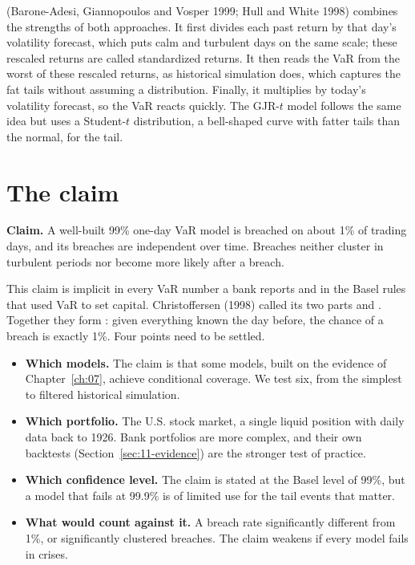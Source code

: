  (Barone-Adesi, Giannopoulos and Vosper 1999; Hull and White 1998) combines the strengths of both approaches. It first divides each past return by that day's volatility forecast, which puts calm and turbulent days on the same scale; these rescaled returns are called standardized returns. It then reads the VaR from the worst of these rescaled returns, as historical simulation does, which captures the fat tails without assuming a distribution. Finally, it multiplies by today's volatility forecast, so the VaR reacts quickly. The GJR-$t$ model follows the same idea but uses a Student-$t$ distribution, a bell-shaped curve with fatter tails than the normal, for the tail.



\section{The claim}
\label{sec:11-claim}

\begin{callout}
\textbf{Claim.} A well-built 99\% one-day VaR model is breached on about 1\% of trading days, and its breaches are independent over time. Breaches neither cluster in turbulent periods nor become more likely after a breach.
\end{callout}

This claim is implicit in every VaR number a bank reports and in the Basel rules that used VaR to set capital. Christoffersen (1998) called its two parts  and . Together they form : given everything known the day before, the chance of a breach is exactly 1\%. Four points need to be settled.

\begin{itemize}
  \item \textbf{Which models.} The claim is that some models, built on the evidence of Chapter~\ref{ch:07}, achieve conditional coverage. We test six, from the simplest to filtered historical simulation.
  \item \textbf{Which portfolio.} The U.S. stock market, a single liquid position with daily data back to 1926. Bank portfolios are more complex, and their own backtests (Section~\ref{sec:11-evidence}) are the stronger test of practice.
  \item \textbf{Which confidence level.} The claim is stated at the Basel level of 99\%, but a model that fails at 99.9\% is of limited use for the tail events that matter.
  \item \textbf{What would count against it.} A breach rate significantly different from 1\%, or significantly clustered breaches. The claim weakens if every model fails in crises.
\end{itemize}

